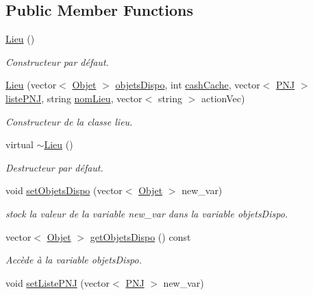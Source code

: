 \subsection*{Public Member Functions}
\begin{DoxyCompactItemize}
\item 
\hyperlink{class_lieu_a0b3086d598fc1bfc0b4c09ae96304b3a}{Lieu} ()
\begin{DoxyCompactList}\small\item\em Constructeur par défaut. \end{DoxyCompactList}\item 
\hyperlink{class_lieu_abb644ef90d500f7b6d7d110b1dc06896}{Lieu} (vector$<$ \hyperlink{class_objet}{Objet} $>$ \hyperlink{class_lieu_a3a65fbb8ecba3f2e265905730ad2e631}{objets\-Dispo}, int \hyperlink{class_lieu_a90b76b521f92a43626ccd29ed5a29f89}{cash\-Cache}, vector$<$ \hyperlink{class_p_n_j}{P\-N\-J} $>$ \hyperlink{class_lieu_a8c1e20b105f7972f22d8f16651de4ebd}{liste\-P\-N\-J}, string \hyperlink{class_lieu_a1e48889fe5c581f043b8bd77ca497fc7}{nom\-Lieu}, vector$<$ string $>$ action\-Vec)
\begin{DoxyCompactList}\small\item\em Constructeur de la classe lieu. \end{DoxyCompactList}\item 
virtual \hyperlink{class_lieu_af0e191bcc85454c9e59d107cfb557b20}{$\sim$\-Lieu} ()
\begin{DoxyCompactList}\small\item\em Destructeur par défaut. \end{DoxyCompactList}\item 
void \hyperlink{class_lieu_a7af4284fb6e898e2ef29ad06ea244cc0}{set\-Objets\-Dispo} (vector$<$ \hyperlink{class_objet}{Objet} $>$ new\-\_\-var)
\begin{DoxyCompactList}\small\item\em stock la valeur de la variable new\-\_\-var dans la variable objets\-Dispo. \end{DoxyCompactList}\item 
vector$<$ \hyperlink{class_objet}{Objet} $>$ \hyperlink{class_lieu_ad4fbedc5d8b53c0b79684aa34c6700b8}{get\-Objets\-Dispo} () const 
\begin{DoxyCompactList}\small\item\em Accède à la variable objets\-Dispo. \end{DoxyCompactList}\item 
void \hyperlink{class_lieu_af9efb050ea38c72ad7d7bc7e2f128875}{set\-Liste\-P\-N\-J} (vector$<$ \hyperlink{class_p_n_j}{P\-N\-J} $>$ new\-\_\-var)

\end{DoxyCompactItemize}
